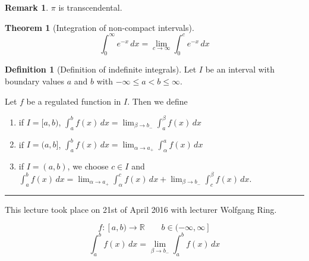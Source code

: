 \documentclass[a4paper,landscape,twocolumn]{article}
\theoremstyle{definition}
\newtheorem{theorem}{Theorem}
\newtheorem{defi}{Definition}
\newtheorem{rem}{Remark}
\newcommand\meta[3]{\hrule{} This #1 took place on #2 with lecturer #3.\par}
\begin{document}
\begin{rem}
  $\pi$ is transcendental.
\end{rem}

\begin{theorem}[Integration of non-compact intervals]
  \[ \int_0^\infty e^{-x} \, dx = \lim_{c\to\infty} \int_0^c e^{-x} \, dx \]
\end{theorem}
\begin{defi}[Definition of indefinite integrals]
  Let $I$ be an interval with boundary values $a$ and $b$ with
  $- \infty \leq a < b \leq \infty$.

  Let $f$ be a regulated function in $I$. Then we define
  \begin{enumerate}
    \item if $I = [a,b)$, $\int_a^b f(x) \, dx = \lim_{\beta \to b_-} \int_a^\beta f(x) \, dx$
    \item if $I = (a,b]$, $\int_a^b f(x) \, dx = \lim_{\alpha \to a_+} \int_\alpha^a f(x) \, dx$
    \item if $I = (a,b)$, we choose $c \in I$ and $\int_a^b f(x) \, dx = \lim_{\alpha\to a_+} \int_\alpha^c f(x) \, dx + \lim_{\beta \to b_-} \int_{c}^\beta f(x) \, dx$.
  \end{enumerate}
\end{defi}

\meta{lecture}{21st of April 2016}{Wolfgang Ring}

\[ f: [a,b) \to \mathbb R \qquad b \in (-\infty, \infty] \]
\[ \int_a^b f(x) \, dx = \lim_{\beta \to b_-} \int_a^b f(x) \, dx \]
\end{document}
